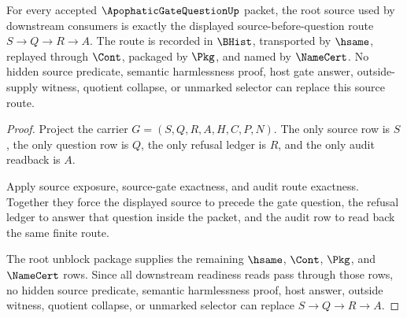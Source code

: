 \begin{theorem}
\label{thm:apophatic-gate-question-root-source-exactness}
For every accepted $\ApophaticGateQuestionUp$ packet, the root source used by downstream consumers is exactly the displayed source-before-question route $S \to Q \to R \to A$. The route is recorded in $\BHist$, transported by $\hsame$, replayed through $\Cont$, packaged by $\Pkg$, and named by $\NameCert$. No hidden source predicate, semantic harmlessness proof, host gate answer, outside-supply witness, quotient collapse, or unmarked selector can replace this source route.
\end{theorem}
\begin{proof}
Project the carrier $G=(S,Q,R,A,H,C,P,N)$. The only source row is $S$, the only question row is $Q$, the only refusal ledger is $R$, and the only audit readback is $A$.

Apply source exposure, source-gate exactness, and audit route exactness. Together they force the displayed source to precede the gate question, the refusal ledger to answer that question inside the packet, and the audit row to read back the same finite route.

The root unblock package supplies the remaining $\hsame$, $\Cont$, $\Pkg$, and $\NameCert$ rows. Since all downstream readiness reads pass through those rows, no hidden source predicate, semantic harmlessness proof, host answer, outside witness, quotient collapse, or unmarked selector can replace $S \to Q \to R \to A$.
\end{proof}



